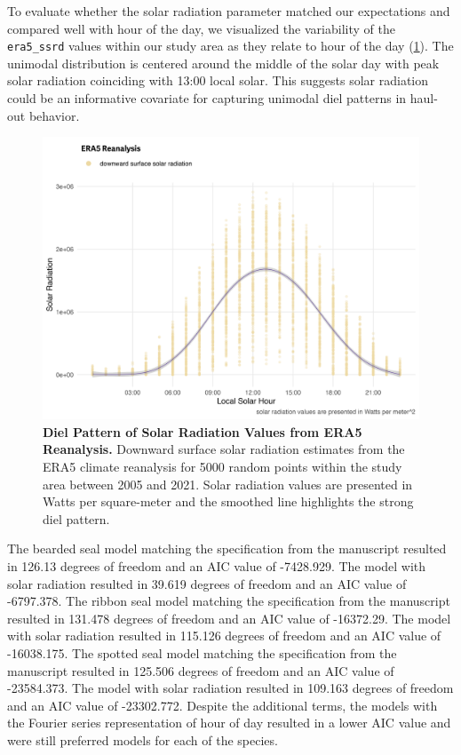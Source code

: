 \documentclass[fleqn,10pt,lineno]{wlpeerj} %
\begin{document}
To evaluate whether the solar radiation parameter matched our expectations and
compared well with hour of the day, we visualized the variability of the
\texttt{era5\_ssrd} values within
our study area as they relate to hour of the day (\ref{fig:era5-ssrd-plot}).
The unimodal distribution
is centered around the middle of the solar day with peak solar radiation
coinciding with 13:00 local solar. This suggests solar radiation could be an
informative covariate for capturing unimodal diel patterns in haul-out
behavior.



\begin{figure}
\includegraphics[width=1\linewidth]{../figures/Figure-016} \caption{\textbf{Diel Pattern of Solar Radiation Values from ERA5 Reanalysis.} \linebreak Downward surface solar radiation estimates from the ERA5 climate reanalysis for 5000 random points within the study area between 2005 and 2021. Solar radiation values are presented in Watts per square-meter and the smoothed line highlights the strong diel pattern.}\label{fig:era5-ssrd-plot}
\end{figure}

The bearded seal model matching the specification from the manuscript resulted in
126.13 degrees of freedom and an AIC value of
-7428.929. The model with solar radiation resulted in
39.619 degrees of freedom and an AIC value of
-6797.378. The ribbon seal model matching the specification from the manuscript resulted in
131.478 degrees of freedom and an AIC value of
-16372.29. The model with solar radiation resulted in
115.126 degrees of freedom and an AIC value of
-16038.175. The spotted seal model matching the specification from the manuscript resulted in
125.506 degrees of freedom and an AIC value of
-23584.373. The model with solar radiation resulted in
109.163 degrees of freedom and an AIC value of
-23302.772. Despite the additional terms, the
models with the Fourier series representation of hour of day resulted in a
lower AIC value and were still preferred models for each of the species.
\end{document}
